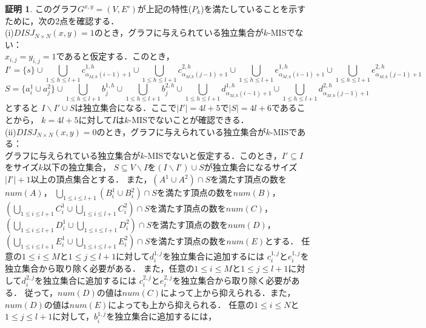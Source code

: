 \documentclass[12pt]{thesis}
\theoremstyle{definition}
\newtheorem*{prf*}{証明}
\begin{document}
\begin{prf*}
このグラフ$G^{x, y} = (V, E')$が上記の特性($P_{k}$)を満たしていることを示すために，次の2点を確認する． \\
(i)$DISJ_{N \times N} (x, y) = 1$のとき，グラフに与えられている独立集合が$k$-MISでない： \\
$x_{i,j}=y_{i,j}=1$であると仮定する．このとき，
\begin{dmath*}
I'=\{s\} \cup \bigcup_{1\leq h \leq l+1}c^{1,h}_{\alpha_{M,h}(i-1)+1} \cup 
\bigcup_{1\leq h \leq l+1}c^{2,h}_{\alpha_{M,h}(j-1)+1} \cup 
\bigcup_{1\leq h \leq l+1}e^{1,h}_{\alpha_{M,h}(i-1)+1} \cup 
\bigcup_{1\leq h \leq l+1}e^{2,h}_{\alpha_{M,h}(j-1)+1}
\end{dmath*}
\begin{dmath*}
S=\{a^{1}_{i} \cup a^{2}_{j}\} \cup 
\bigcup_{1\leq h \leq l+1}b^{1,h}_{j} \cup 
\bigcup_{1\leq h \leq l+1}b^{2,h}_{j} \cup 
\bigcup_{1\leq h \leq l+1}d^{1,h}_{\alpha_{M,h}(i-1)+1} \cup  
\bigcup_{1\leq h \leq l+1}d^{2,h}_{\alpha_{M,h}(j-1)+1}
\end{dmath*}
とすると
$I \backslash I' \cup S$は独立集合になる．ここで$|I'|=4l+5$で$|S|=4l+6$であることから，
$k=4l+5$に対して$I$は$k$-MISでないことが確認できる． \\
(ii)$DISJ_{N \times N} (x, y) = 0$のとき，グラフに与えられている独立集合が$k$-MISである： \\ 
グラフに与えられている独立集合が$k$-MISでないと仮定する．このとき，$I'\subseteq I$をサイズ$k$以下の独立集合，
$S\subseteq V\backslash I$を$(I \backslash I') \cup S$が独立集合になるサイズ$|I'|+1$以上の頂点集合とする．
また，$(A^{1}\cup A^{2}) \cap S$を満たす頂点の数を$num(A)$，
$\bigcup_{1\leq i \leq l+1}(B_{i}^{1} \cup B_{i}^{2}) \cap S$を満たす頂点の数を$num(B)$，
$\left(\bigcup_{1\leq i \leq l+1}C_{i}^{1} \cup \bigcup_{1\leq i \leq l+1}C_{i}^{2}\right) \cap S$を満たす頂点の数を$num(C)$，
$\left(\bigcup_{1\leq i \leq l+1}D_{i}^{1} \cup \bigcup_{1\leq i \leq l+1}D_{i}^{2}\right) \cap S$を満たす頂点の数を$num(D)$，\\
$\left(\bigcup_{1\leq i \leq l+1}E_{i}^{1} \cup \bigcup_{1\leq i \leq l+1}E_{i}^{2}\right) \cap S$を満たす頂点の数を$num(E)$とする．
 任意の$1\leq i \leq M$と$1\leq j \leq l+1$に対して$d^{1,j}_{i}$を独立集合に追加するには
 $c^{1,j}_{i}$と$e^{1,j}_{i}$を独立集合から取り除く必要がある．
また，任意の$1\leq i \leq M$と$1\leq j \leq l+1$に対して$d^{2,j}_{i}$を独立集合に追加するには
$c^{2,j}_{i}$と$e^{2,j}_{i}$を独立集合から取り除く必要がある．
従って，$num(D)$の値は$num(C)$によって上から抑えられる．また，$num(D)$の値は$num(E)$によっても上から抑えられる．
任意の$1\leq i \leq N$と$1\leq j \leq l+1$に対して，$b^{1,j}_{i}$を独立集合に追加するには，

\end{prf*}
\end{document}
